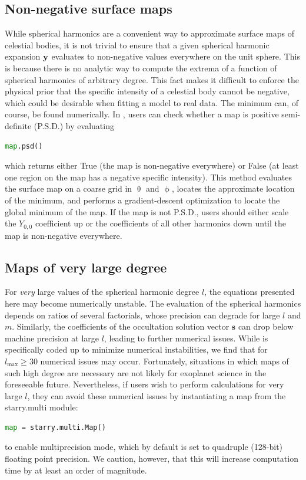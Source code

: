 \documentclass[modern]{aastex61}
\begin{document}
\subsection{Non-negative surface maps}
\label{sec:nonnegative}
While spherical harmonics are a convenient way to approximate surface
maps of celestial bodies, it is not trivial to ensure
that a given spherical harmonic expansion ${\mathbf{y}}$ evaluates to
non-negative values everywhere on the unit sphere. This is because
there is no analytic way to compute the extrema of a function of
spherical harmonics of arbitrary degree.
This fact makes it difficult to enforce the physical prior that the
specific intensity of a celestial body cannot be negative, which
could be desirable when fitting a model to real data. The minimum
can, of course, be found numerically. In \starry, users can check
whether a map is positive semi-definite (P.S.D.) by evaluating
%
\begin{lstlisting}[language=Python,firstnumber=last]
map.psd()
\end{lstlisting}
%
which returns either \textsf{True} (the map is non-negative
everywhere) or \textsf{False} (at least one region on the map has
a negative specific intensity).
This method evaluates the surface map on a coarse grid in
$\uptheta$ and $\upphi$, locates the
approximate location of the minimum, and performs a gradient-descent
optimization to locate the global minimum of the map. If the map is
not P.S.D., users should either scale the $Y_{0,0}$ coefficient up
or the coefficients of all other harmonics down until the map is
non-negative everywhere.

\subsection{Maps of very large degree}
For \emph{very} large values of the spherical harmonic degree $l$, the
equations presented here may become numerically unstable. The evaluation
of the spherical harmonics depends on ratios of several factorials, whose
precision can degrade for large $l$ and $m$. Similarly, the coefficients
of the occultation solution vector $\mathbf{s}$ can drop below machine
precision at large $l$, leading to further numerical issues. While
\starry is specifically coded up to minimize numerical instabilities,
we find that for $l_\mathrm{max} \geq 30$ numerical issues may occur.
Fortunately, situations in which maps of such high degree are necessary
are not likely for exoplanet science in the foreseeable future.
Nevertheless, if users wish to perform calculations for very large $l$,
they can avoid these numerical issues by instantiating a map from the \textsf{starry.multi}
module:
%
\begin{lstlisting}[language=Python,firstnumber=last]
map = starry.multi.Map()
\end{lstlisting}
%
to enable multiprecision mode, which by default is set to quadruple (128-bit)
floating point precision. We caution, however, that this will increase
computation time by at least an order of magnitude.
\end{document}
